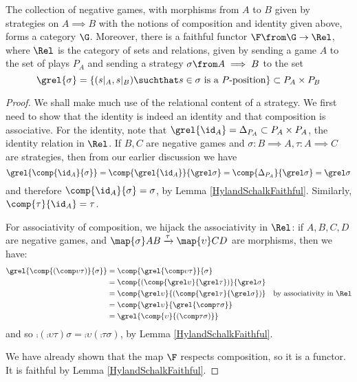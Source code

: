 \documentclass[11pt]{article} %
\begin{document}
\begin{theorem}
  \label{IsCategory}
  The collection of negative games, with morphisms from $A$ to $B$ given by strategies on $A\implies B$ with the notions of composition and identity given above, forms a category $\G$.  Moreover, there is a faithful functor $\F\from\G\to\Rel$, where $\Rel$ is the category of sets and relations, given by sending a game $A$ to the set of plays $P_A$ and sending a strategy $\sigma\from A\implies B$ to the set
  \[
    \grel{\sigma}=\{(s\vert_A,s\vert_B)\suchthat \textrm{$s\in\sigma$ is a $P$-position}\}\subset P_A\times P_B
    \]
  \begin{proof}
    We shall make much use of the relational content of a strategy.  We first need to show that the identity is indeed an identity and that composition is associative.  For the identity, note that $\grel{\id_A}=\Delta_{P_A}\subset P_A\times P_A$, the identity relation in $\Rel$.  If $B,C$ are negative games and $\sigma\colon B\implies A,\tau\colon A\implies C$ are strategies, then from our earlier discussion we have
    \[
      \grel{\comp{\id_A}{\sigma}}=\comp{\grel{\id_A}}{\grel\sigma}=\comp{\Delta_{P_A}}{\grel\sigma}=\grel\sigma
      \]
    and therefore $\comp{\id_A}{\sigma}=\sigma$, by Lemma \ref{HylandSchalkFaithful}.  Similarly, $\comp{\tau}{\id_A}=\tau$.  

    For associativity of composition, we hijack the associativity in $\Rel$: if $A,B,C,D$ are negative games, and $\map{\sigma}AB\xrightarrow{\tau}\map{\upsilon}CD$ are morphisms, then we have:
    \begin{align*}
      \grel{\comp{(\comp\upsilon\tau)}{\sigma}} & = \comp{\grel{\comp\upsilon\tau}}{\sigma} \\
        & = \comp{(\comp{\grel\upsilon}{\grel\tau})}{\grel\sigma} \\
        & = \comp{\grel\upsilon}{(\comp{\grel\tau}{\grel\sigma})} \quad\textrm{by associativity in $\Rel$} \\
        & = \comp{\grel\upsilon}{\grel{\comp\tau\sigma}} \\
        & = \grel{\comp{\upsilon}{(\comp\tau\sigma)}}
    \end{align*}
    and so $\comp{(\comp\upsilon\tau)}{\sigma}=\comp{\upsilon}{(\comp\tau\sigma)}$, by Lemma \ref{HylandSchalkFaithful}.  

    We have already shown that the map $\F$ respects composition, so it is a functor.  It is faithful by Lemma \ref{HylandSchalkFaithful}.
  \end{proof}
\end{theorem}
\end{document}
